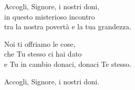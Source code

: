 
Accogli, Signore, i nostri doni,\\
in questo misterioso incontro\\
tra la nostra povertà e la tua grandezza.

\spazio

Noi ti offriamo le cose,\\
che Tu stesso ci hai dato\\
e Tu in cambio donaci, donaci Te stesso.

\spazio

Accogli, Signore, i nostri doni.
